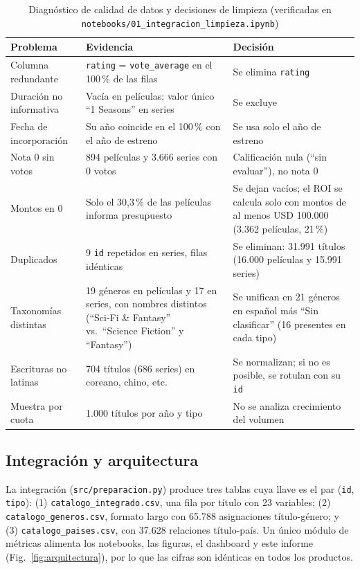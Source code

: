 \documentclass[conference,a4paper]{IEEEtran}
\begin{document}
\begin{table}[!t]
\caption{Diagnóstico de calidad de datos y decisiones de limpieza (verificadas en \texttt{notebooks/01\_integracion\_limpieza.ipynb})}
\label{tab:limpieza}
\centering\footnotesize
\begin{tabularx}{\textwidth}{@{}P{3.3cm}LP{6.3cm}@{}}
\toprule
Problema & Evidencia & Decisión\\
\midrule
Columna redundante & \texttt{rating} = \texttt{vote\_average} en el 100\,\% de las filas & Se elimina \texttt{rating}\\
Duración no informativa & Vacía en películas; valor único ``1 Seasons'' en series & Se excluye\\
Fecha de incorporación & Su año coincide en el 100\,\% con el año de estreno & Se usa solo el año de estreno\\
Nota 0 sin votos & 894 películas y 3.666 series con 0 votos & Calificación nula (``sin evaluar''), no nota 0\\
Montos en 0 & Solo el 30,3\,\% de las películas informa presupuesto & Se dejan vacíos; el ROI se calcula solo con montos de al menos USD 100.000 (3.362 películas, 21\,\%)\\
Duplicados & 9 \texttt{id} repetidos en series, filas idénticas & Se eliminan: 31.991 títulos (16.000 películas y 15.991 series)\\
Taxonomías distintas & 19 géneros en películas y 17 en series, con nombres distintos (``Sci-Fi \& Fantasy'' vs.\ ``Science Fiction'' y ``Fantasy'') & Se unifican en 21 géneros en español más ``Sin clasificar'' (16 presentes en cada tipo)\\
Escrituras no latinas & 704 títulos (686 series) en coreano, chino, etc. & Se normalizan; si no es posible, se rotulan con su \texttt{id}\\
Muestra por cuota & 1.000 títulos por año y tipo & No se analiza crecimiento del volumen\\
\bottomrule
\end{tabularx}
\end{table}

\subsection{Integración y arquitectura}
La integración (\texttt{src/preparacion.py}) produce tres tablas cuya llave es el par (\texttt{id}, \texttt{tipo}): (1) \texttt{catalogo\_integrado.csv}, una fila por título con 23 variables; (2) \texttt{catalogo\_generos.csv}, formato largo con 65.788 asignaciones título-género; y (3) \texttt{catalogo\_paises.csv}, con 37.628 relaciones título-país. Un único módulo de métricas alimenta los notebooks, las figuras, el dashboard y este informe (Fig.~\ref{fig:arquitectura}), por lo que las cifras son idénticas en todos los productos.
\end{document}
